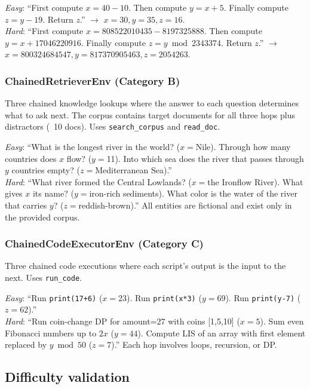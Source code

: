 \emph{Easy}: ``First compute $x = 40 - 10$. Then compute $y = x + 5$. Finally compute $z = y - 19$. Return $z$.'' $\to$ $x{=}30, y{=}35, z{=}16$.\\
\emph{Hard}: ``First compute $x = 808522010435 - 8197325888$. Then compute $y = x + 17046220916$. Finally compute $z = y \bmod 2343374$. Return $z$.'' $\to$ $x{=}800324684547, y{=}817370905463, z{=}2054263$.

\subsubsection{ChainedRetrieverEnv (Category B)}

Three chained knowledge lookups where the answer to each question determines what to ask next. The corpus contains target documents for all three hops plus distractors (~10 docs). Uses \texttt{search\_corpus} and \texttt{read\_doc}.

\emph{Easy}: ``What is the longest river in the world? ($x{=}$Nile). Through how many countries does $x$ flow? ($y{=}$11). Into which sea does the river that passes through $y$ countries empty? ($z{=}$Mediterranean Sea).''\\
\emph{Hard}: ``What river formed the Central Lowlands? ($x{=}$the Ironflow River). What gives $x$ its name? ($y{=}$iron-rich sediments). What color is the water of the river that carries $y$? ($z{=}$reddish-brown).'' All entities are fictional and exist only in the provided corpus.

\subsubsection{ChainedCodeExecutorEnv (Category C)}

Three chained code executions where each script's output is the input to the next. Uses \texttt{run\_code}.

\emph{Easy}: ``Run \texttt{print(17+6)} ($x{=}23$). Run \texttt{print(x*3)} ($y{=}69$). Run \texttt{print(y-7)} ($z{=}62$).''\\
\emph{Hard}: ``Run coin-change DP for amount=27 with coins [1,5,10] ($x{=}5$). Sum even Fibonacci numbers up to $2x$ ($y{=}44$). Compute LIS of an array with first element replaced by $y\bmod50$ ($z{=}7$).'' Each hop involves loops, recursion, or DP.

\subsection{Difficulty validation}

